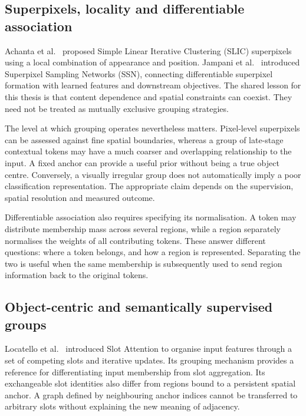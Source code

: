 \subsection{Superpixels, locality and differentiable association}

Achanta et al.~\cite{achanta2012slic} proposed Simple Linear Iterative
Clustering (SLIC) superpixels using a local combination of appearance and
position. Jampani et al.~\cite{jampani2018ssn} introduced Superpixel Sampling
Networks (SSN), connecting differentiable superpixel formation with learned
features and downstream objectives. The shared lesson for this thesis is
that content dependence and spatial constraints can coexist. They need not
be treated as mutually exclusive grouping strategies.

The level at which grouping operates nevertheless matters. Pixel-level
superpixels can be assessed against fine spatial boundaries, whereas a
group of late-stage contextual tokens may have a much coarser and overlapping
relationship to the input. A fixed anchor can provide a useful prior without
being a true object centre. Conversely, a visually irregular group does not
automatically imply a poor classification representation. The appropriate
claim depends on the supervision, spatial resolution and measured outcome.

Differentiable association also requires specifying its normalisation. A
token may distribute membership mass across several regions, while a region
separately normalises the weights of all contributing tokens. These answer
different questions: where a token belongs, and how a region is represented.
Separating the two is useful when the same membership is subsequently used
to send region information back to the original tokens.

\subsection{Object-centric and semantically supervised groups}

Locatello et al.~\cite{locatello2020slot} introduced Slot Attention to
organise input features through a set of competing slots and iterative
updates. Its grouping mechanism provides a reference for differentiating
input membership from slot aggregation. Its exchangeable slot identities
also differ from regions bound to a persistent spatial anchor. A graph
defined by neighbouring anchor indices cannot be transferred to arbitrary
slots without explaining the new meaning of adjacency.

